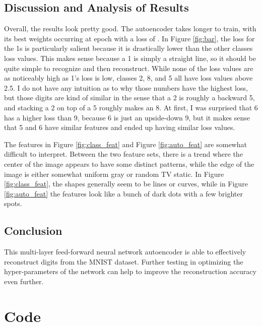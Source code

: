 \documentclass[a4paper, 12pt, titlepage]{article}
\newcommand{\figRef}[1]{Figure \ref{#1}}
\begin{document}
  \subsection{Discussion and Analysis of Results}
  \par Overall, the results look pretty good.
  The autoencoder takes longer to train, with its best weights occurring at
  epoch \unskip{} with a loss of
  \unskip{}.
  In \figRef{fig:bar}, the loss for the 1s is particularly salient because it
  is drastically lower than the other classes loss values.
  This makes sense because a 1 is simply a straight line, so it should be quite
  simple to recognize and then reconstruct.
  While none of the loss values are as noticeably high as 1's loss is low,
  classes 2, 8, and 5 all have loss values above 2.5.
  I do not have any intuition as to why those numbers have the highest loss,
  but those digits are kind of similar in the sense that a 2 is roughly a
  backward 5, and stacking a 2 on top of a 5 roughly makes an 8.
  At first, I was surprised that 6 has a higher loss than 9, because 6 is just
  an upside-down 9, but it makes sense that 5 and 6 have similar features and
  ended up having similar loss values.
  \par The features in \figRef{fig:class_feat} and \figRef{fig:auto_feat} are
  somewhat difficult to interpret.
  Between the two feature sets, there is a trend where the center of the image
  appears to have some distinct patterns, while the edge of the image is either
  somewhat uniform gray or random TV static.
  In \figRef{fig:class_feat}, the shapes generally seem to be lines or curves,
  while in \figRef{fig:auto_feat} the features look like a bunch of dark dots
  with a few brighter spots.


  \subsection{Conclusion}
  \par This multi-layer feed-forward neural network autoencoder is able to
  effectively reconstruct digits from the MNIST dataset.
  Further testing in optimizing the hyper-parameters of the network can help to
  improve the reconstruction accuracy even further.

  \pagebreak
  \appendix
  \section{Code}
\end{document}

